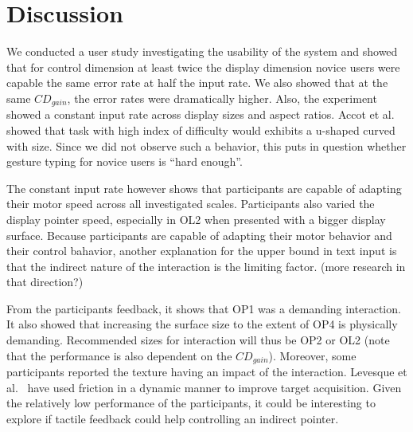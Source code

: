 \documentclass{chi-ext}
\newcommand{\cdt}[1]{{\small\uppercase{{#1}}}}
\begin{document}
\section{Discussion}


We conducted a user study investigating the usability of the system and showed that for control dimension at least twice the display dimension novice users were capable the same error rate at half the input rate. We also showed that at the same $CD_{gain}$, the error rates were dramatically higher. Also, the experiment showed a constant input rate across display sizes and aspect ratios. Accot et al.~\cite{Accot2001} showed that task with high index of difficulty would exhibits a u-shaped curved with size. Since we did not observe such a behavior, this puts in question whether gesture typing for novice users is “hard enough”.

The constant input rate however shows that participants are capable of adapting their motor speed across all investigated scales. Participants also varied the display pointer speed, especially in \cdt{OL2} when presented with a bigger display surface. Because participants are capable of adapting their motor behavior and their control bahavior, another explanation for the upper bound in text input is that the indirect nature of the interaction is the limiting factor. (more research in that direction?)

From the participants feedback, it shows that \cdt{OP1} was a demanding interaction. It also showed that increasing the surface size to the extent of \cdt{OP4} is physically demanding. Recommended sizes for interaction will thus be \cdt{OP2} or \cdt{OL2} (note that the performance is also dependent on the $CD_{gain}$). Moreover, some participants reported the texture having an impact of the interaction. Levesque et al.~\cite{Levesque2011} have used friction in a dynamic manner to improve target acquisition. Given the relatively low performance of the participants, it could be interesting to explore if tactile feedback could help controlling an indirect pointer.
\end{document}
